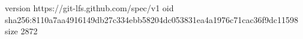 version https://git-lfs.github.com/spec/v1
oid sha256:8110a7aa4916149db27c334ebb58204dc053831ea4a1976c71cac36f9dc11598
size 2872
